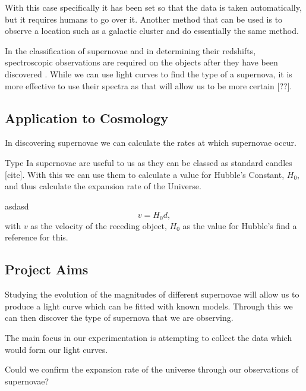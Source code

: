 \documentclass[twocolumn]{revtex4}
\begin{document}
With this case specifically it has been set so that the data is taken automatically, but it requires humans to go over it. Another method that can be used is to observe a location such as a galactic cluster and do essentially the same method.

In the classification of supernovae and in determining their redshifts, spectroscopic observations are required on the objects after they have been discovered \cite{lascumbres}. While we can use light curves to find the type of a supernova, it is more effective to use their spectra as that will allow us to be more certain [??].

\vspace{-3ex}
\subsection{Application to Cosmology} \label{appcosmo}
\vspace{-2ex}

In discovering supernovae we can calculate the rates at which supernovae occur.

Type Ia supernovae are useful to us as they can be classed as standard candles [cite]. With this we can use them to calculate a value for Hubble's Constant, $H_0$, and thus calculate the expansion rate of the Universe.

asdasd \cite{abs_phil}
\begin{equation}
v = H_0 d, 
\end{equation}
with $v$ as the velocity of the receding object, $H_0$ as the value for Hubble's 
find a reference for this.

\vspace{-3ex}
\subsection{Project Aims}
\vspace{-2ex}

Studying the evolution of the magnitudes of different supernovae will allow us to produce a light curve which can be fitted with known models. Through this we can then discover the type of supernova that we are observing. 

The main focus in our experimentation is attempting to collect the data which would form our light curves. 

Could we confirm the expansion rate of the universe through our observations of supernovae? 

\vspace{-3ex}
\end{document}
